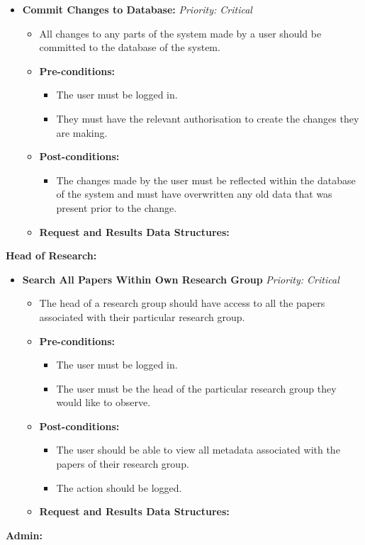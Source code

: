 \documentclass{article}
\begin{document}
\begin{itemize}
					\item \textbf{Commit Changes to Database:} \hfill \textit{Priority: Critical}
					\begin{itemize}
						\item All changes to any parts of the system made by a user should be committed to the database of the system.
						\item \textbf{Pre-conditions:}
						\begin{itemize}
							\item The user must be logged in.
							\item They must have the relevant authorisation to create the changes they are making.
						\end{itemize}
						\item \textbf{Post-conditions:}
						\begin{itemize}
							\item The changes made by the user must be reflected within the database of the system and must have overwritten any old data that was present prior to the change.
						\end{itemize}
						\item \textbf{Request and Results Data Structures:}
					\end{itemize}										
				\end{itemize}
				\textbf{Head of Research:}
				
				\begin{itemize}
					\item \textbf{Search All Papers Within Own Research Group} \hfill \textit{Priority: Critical}
					\begin{itemize}
						\item The head of a research group should have access to all the papers associated with their particular research group.
						\item \textbf{Pre-conditions:}
						\begin{itemize}
							\item The user must be logged in.
							\item The user must be the head of the particular research group they would like to observe.
						\end{itemize}
						\item \textbf{Post-conditions:}
						\begin{itemize}
							\item The user should be able to view all metadata associated with the papers of their research group.
							\item The action should be logged.
						\end{itemize}
						\item \textbf{Request and Results Data Structures:}
					\end{itemize}
				\end{itemize}
				\textbf{Admin:}
				
\end{document}
